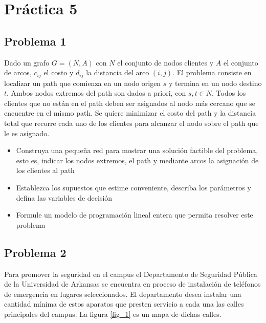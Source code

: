 \documentclass[letterpaper]{article}
\begin{document}
\vspace*{0.1\baselineskip}
\section*{Práctica 5}
\subsection*{Problema 1}
Dado un grafo $G=(N,A)$ con $N$ el conjunto de nodos clientes y $A$ el conjunto de arcos, $c_{ij}$ el costo y $d_{ij}$ la distancia del arco $(i,j)$. El problema consiste en localizar un path que comienza en un nodo origen $s$ y termina en un nodo destino $t$. Ambos nodos extremos del path son dados a priori, con $s,t \in N$. Todos los clientes que no están en el path deben ser asignados al nodo más cercano que se encuentre en el mismo path. Se quiere minimizar el costo del path y la distancia total que recorre cada uno de los clientes para alcanzar el nodo sobre el path que le es asignado.
\begin{itemize}
\item Construya una pequeña red para mostrar una solución factible del problema, esto es, indicar los nodos extremos, el path y mediante arcos la asignación de los clientes al path
\item Establezca los supuestos que estime conveniente, describa los parámetros y defina las variables de decisión
\item Formule un modelo de programación lineal entera que permita resolver este problema
\end{itemize}

\subsection*{Problema 2}
Para promover la seguridad en el campus el Departamento de Seguridad Pública de la Universidad de Arkansas se encuentra en proceso de instalación de teléfonos de emergencia en lugares seleccionados. El departamento desea instalar una cantidad mínima de estos aparatos que presten servicio
a cada una las calles principales del campus. La figura \ref{fig_1} es un mapa de dichas calles.
\end{document}
